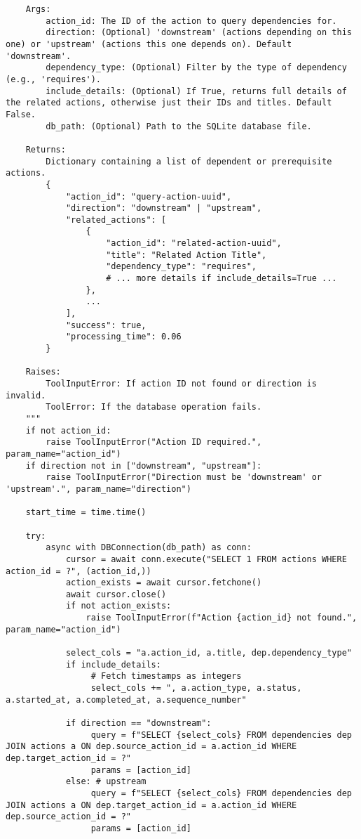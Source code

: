 \documentclass[12pt,a4paper]{article}
\begin{document}
\begin{pageablecode}
\begin{verbatim}
    Args:
        action_id: The ID of the action to query dependencies for.
        direction: (Optional) 'downstream' (actions depending on this one) or 'upstream' (actions this one depends on). Default 'downstream'.
        dependency_type: (Optional) Filter by the type of dependency (e.g., 'requires').
        include_details: (Optional) If True, returns full details of the related actions, otherwise just their IDs and titles. Default False.
        db_path: (Optional) Path to the SQLite database file.

    Returns:
        Dictionary containing a list of dependent or prerequisite actions.
        {
            "action_id": "query-action-uuid",
            "direction": "downstream" | "upstream",
            "related_actions": [
                {
                    "action_id": "related-action-uuid",
                    "title": "Related Action Title",
                    "dependency_type": "requires",
                    # ... more details if include_details=True ...
                },
                ...
            ],
            "success": true,
            "processing_time": 0.06
        }

    Raises:
        ToolInputError: If action ID not found or direction is invalid.
        ToolError: If the database operation fails.
    """
    if not action_id: 
        raise ToolInputError("Action ID required.", param_name="action_id")
    if direction not in ["downstream", "upstream"]: 
        raise ToolInputError("Direction must be 'downstream' or 'upstream'.", param_name="direction")

    start_time = time.time()

    try:
        async with DBConnection(db_path) as conn:
            cursor = await conn.execute("SELECT 1 FROM actions WHERE action_id = ?", (action_id,))
            action_exists = await cursor.fetchone()
            await cursor.close()
            if not action_exists: 
                raise ToolInputError(f"Action {action_id} not found.", param_name="action_id")

            select_cols = "a.action_id, a.title, dep.dependency_type"
            if include_details:
                 # Fetch timestamps as integers
                 select_cols += ", a.action_type, a.status, a.started_at, a.completed_at, a.sequence_number"

            if direction == "downstream":
                 query = f"SELECT {select_cols} FROM dependencies dep JOIN actions a ON dep.source_action_id = a.action_id WHERE dep.target_action_id = ?"
                 params = [action_id]
            else: # upstream
                 query = f"SELECT {select_cols} FROM dependencies dep JOIN actions a ON dep.target_action_id = a.action_id WHERE dep.source_action_id = ?"
                 params = [action_id]


\end{verbatim}
\end{pageablecode}
\end{document}
